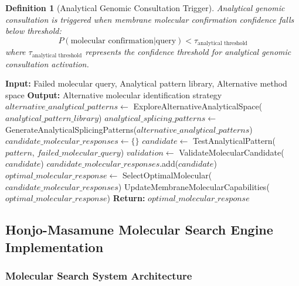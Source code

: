 \documentclass[11pt,a4paper]{article}
\newtheorem{definition}[theorem]{Definition}
\theoremstyle{remark}
\begin{document}
{{{{{{{{{{\begin{definition}[Analytical Genomic Consultation Trigger]
Analytical genomic consultation is triggered when membrane molecular confirmation confidence falls below threshold:
\begin{equation}
P(\text{molecular confirmation} | \text{query}) < \tau_{\text{analytical threshold}}
\end{equation}
where $\tau_{\text{analytical threshold}}$ represents the confidence threshold for analytical genomic consultation activation.
\end{definition}

\begin{algorithm}[H]
\caption{Sachikonye's Analytical Genomic Consultation Algorithm}
\begin{algorithmic}[1]
\State \textbf{Input:} Failed molecular query, Analytical pattern library, Alternative method space
\State \textbf{Output:} Alternative molecular identification strategy
    \State $alternative\_analytical\_patterns \gets$ ExploreAlternativeAnalyticalSpace($analytical\_pattern\_library$)
    \State $analytical\_splicing\_patterns \gets$ GenerateAnalyticalSplicingPatterns($alternative\_analytical\_patterns$)
    \State $candidate\_molecular\_responses \gets \{\}$
        \State $candidate \gets$ TestAnalyticalPattern($pattern$, $failed\_molecular\_query$)
        \State $validation \gets$ ValidateMolecularCandidate($candidate$)
            \State $candidate\_molecular\_responses$.add($candidate$)
        \EndIf
    \EndFor
    \State $optimal\_molecular\_response \gets$ SelectOptimalMolecular($candidate\_molecular\_responses$)
    \State UpdateMembraneMolecularCapabilities($optimal\_molecular\_response$)
    \State \textbf{Return:} $optimal\_molecular\_response$
\EndProcedure
\end{algorithmic}
\end{algorithm}

\subsection{Honjo-Masamune Molecular Search Engine Implementation}

\subsubsection{Molecular Search System Architecture}

}}}}}}}}}}
\end{document}
